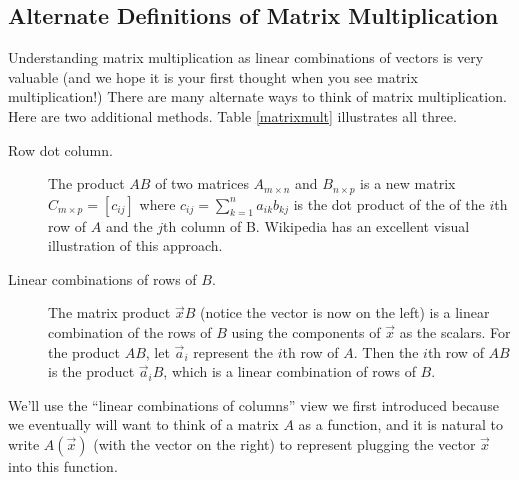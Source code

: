 \subsection{Alternate Definitions of Matrix Multiplication} 
Understanding matrix multiplication as linear combinations of vectors is very valuable (and we hope it is your first thought when you see matrix multiplication!)  There are many alternate ways to think of matrix multiplication. Here are two additional methods. Table \ref{matrixmult} illustrates all three.
\begin{description}
	\item[Row dot column.] The product {$AB$} of two matrices {$A_{m\times n}$} and {$B_{n\times p}$} is a new matrix {$C_{m\times p}=[c_{ij}]$} where $c_{ij}=\sum_{k=1}^n a_{ik}b_{kj}$ is the dot product of the of the {$i$}th row of {$A$} and the {$j$}th column of B.  Wikipedia has an excellent visual illustration of this approach.	
	 
	\item[Linear combinations of rows of $B$.] The matrix product $\vec x B$ (notice the vector is now on the left) is a linear combination of the rows of $B$ using the components of $\vec x$ as the scalars. For the product $AB$, let $\vec a_i$ represent the $i$th row of $A$.  Then the $i$th row of $AB$ is the product $\vec a_iB$, which is a linear combination of rows of $B$.  
\end{description}

We'll use the ``linear combinations of columns'' view we first introduced because we eventually will want to think of a matrix $A$ as a function, and it is natural to write $A(\vec x)$ (with the vector on the right) to represent plugging the vector $\vec x$ into this function.

